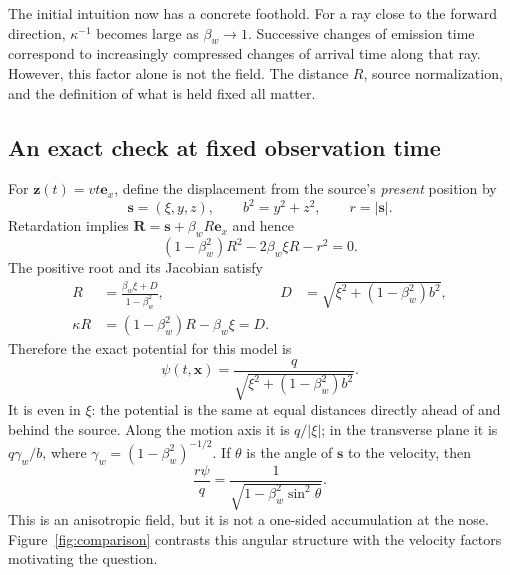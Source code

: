 \documentclass[11pt,a4paper]{article}
\numberwithin{equation}{section}
\begin{document}
The initial intuition now has a concrete foothold. For a ray close to the forward direction, $\kappa^{-1}$ becomes large as $\beta_w\to1$. Successive changes of emission time correspond to increasingly compressed changes of arrival time along that ray. However, this factor alone is not the field. The distance $R$, source normalization, and the definition of what is held fixed all matter.

\subsection{An exact check at fixed observation time}

For $\bm z(t)=vt\bm e_x$, define the displacement from the source's \emph{present} position by
\begin{equation}
 \bm s=(\xi,y,z),\qquad b^2=y^2+z^2,\qquad r=|\bm s|.
\end{equation}
Retardation implies $\bm R=\bm s+\beta_w R\bm e_x$ and hence
\begin{equation}
 (1-\beta_w^2)R^2-2\beta_w\xi R-r^2=0.
\end{equation}
The positive root and its Jacobian satisfy
\begin{align}
 R&=\frac{\beta_w\xi+D}{1-\beta_w^2},
 &D&=\sqrt{\xi^2+(1-\beta_w^2)b^2},\\
 \kappa R&=(1-\beta_w^2)R-\beta_w\xi=D.
 \label{eq:D}
\end{align}
Therefore the exact potential for this model is
\begin{equation}
 \boxed{\psi(t,\bm x)=\frac{q}{\sqrt{\xi^2+(1-\beta_w^2)b^2}}.}
 \label{eq:uniform-scalar}
\end{equation}
It is even in $\xi$: the potential is the same at equal distances directly ahead of and behind the source. Along the motion axis it is $q/|\xi|$; in the transverse plane it is $q\gamma_w/b$, where $\gamma_w=(1-\beta_w^2)^{-1/2}$. If $\theta$ is the angle of $\bm s$ to the velocity, then
\begin{equation}
 \frac{r\psi}{q}=\frac{1}{\sqrt{1-\beta_w^2\sin^2\theta}}.
 \label{eq:angular}
\end{equation}
This is an anisotropic field, but it is not a one-sided accumulation at the nose. Figure~\ref{fig:comparison} contrasts this angular structure with the velocity factors motivating the question.
\end{document}

